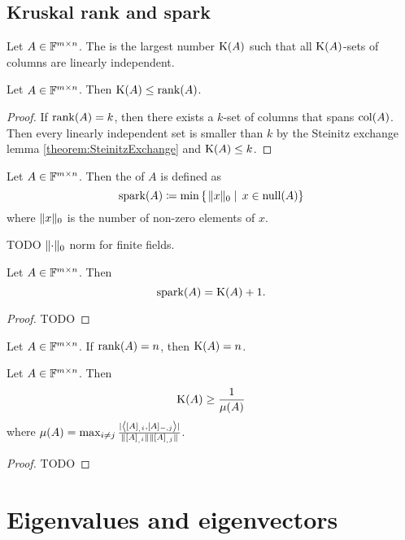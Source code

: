 \subsection{Kruskal rank and spark}
\begin{definition}
Let $A\in \mathbb{F}^{m\times n}$. The  is the largest number $\operatorname{K}(A)$ such that all $\operatorname{K}(A)$-sets of columns are linearly independent.
\end{definition}
\begin{lemma}
Let $A\in \mathbb{F}^{m\times n}$. Then $\operatorname{K}(A) \leq \operatorname{rank}(A)$.
\end{lemma}
\begin{proof}
If $\operatorname{rank}(A) = k$, then there exists a $k$-set of columns that spans $\operatorname{col}(A)$. Then every linearly independent set is smaller than $k$ by the Steinitz exchange lemma \ref{theorem:SteinitzExchange} and $\operatorname{K}(A) \leq k$.
\end{proof}

\begin{definition}
Let $A\in \mathbb{F}^{m\times n}$. Then the  of $A$ is defined as
\[ \operatorname{spark}(A) \coloneqq \min\left\{\left. \lVert x\rVert_0 \;\right|\; x\in\operatorname{null}(A) \right\} \]
where $\lVert x\rVert_0$ is the number of non-zero elements of $x$.
\end{definition}
TODO $\lVert\cdot\rVert_0$ norm for finite fields.

\begin{lemma}
Let $A\in \mathbb{F}^{m\times n}$. Then
\[ \operatorname{spark}(A) = \operatorname{K}(A) + 1. \]
\end{lemma}
\begin{proof}
TODO
\end{proof}

\begin{lemma}
Let $A\in \mathbb{F}^{m\times n}$. If $\operatorname{rank}(A) = n$, then $\operatorname{K}(A) = n$.
\end{lemma}

\begin{proposition}
Let $A\in \mathbb{F}^{m\times n}$. Then
\[ \operatorname{K}(A) \geq \frac{1}{\mu(A)} \]
where $\mu(A) = \max_{i\neq j} \frac{|\left\langle [A]_{_,i},[A]_{-,j} \right\rangle|}{\lVert[A]_{_,i}\rVert\lVert[A]_{_,j}\rVert}$.
\end{proposition}
\begin{proof}
TODO
\end{proof}


\section{Eigenvalues and eigenvectors}
